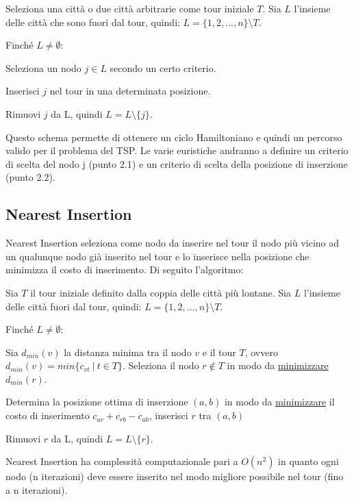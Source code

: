 \documentclass[a4paper,12pt]{report}
\begin{document}
\begin{tcolorbox}[colframe=black,colback=white,boxrule=0.5pt, sharp corners, breakable]
\begin{legal}
  \item Seleziona una città o due città arbitrarie come tour iniziale $T$. Sia $L$ l'insieme delle città che sono fuori dal tour, quindi: $L = \{1, 2, ..., n\} \setminus T$.
  \item Finché $L \neq \emptyset$:
  \begin{legal}
    \item Seleziona un nodo $j \in L$ secondo un certo criterio.
    \item Inserisci $j$ nel tour in una determinata posizione.
    \item Rimuovi $j$ da L, quindi $L = L \setminus \{j\}$.
  \end{legal}
\end{legal}
\end{tcolorbox}
\hfill \break
Questo schema permette di ottenere un ciclo Hamiltoniano e quindi un percorso valido per il problema del TSP. Le varie euristiche andranno a definire un criterio di scelta del nodo j (punto 2.1) e un criterio di scelta della posizione di inserzione (punto 2.2).

\subsection{Nearest Insertion} \label{ssec:NI}
Nearest Insertion seleziona come nodo da inserire nel tour il nodo più vicino ad un qualunque nodo già inserito nel tour e lo inserisce nella posizione che minimizza il costo di inserimento. Di seguito l'algoritmo:

\begin{tcolorbox}[colframe=black,colback=white,boxrule=0.5pt, sharp corners, breakable]
  \begin{legal}
    \item Sia $T$ il tour iniziale definito dalla coppia delle città più lontane. Sia $L$ l'insieme delle città fuori dal tour, quindi: $L = \{1, 2, ..., n\} \setminus T$.
    \item Finché $L \neq \emptyset$:
    \begin{legal}
      \item Sia $d_{min}(v)$ la distanza minima tra il nodo $v$ e il tour $T$, ovvero $d_{min}(v) = min\{c_{vt} \  | \ t \in T \}$. Seleziona il nodo $r \not \in T$ in modo da \underline{minimizzare} $d_{min}(r)$.
      \item Determina la posizione ottima di inserzione $(a, b)$ in modo da \underline{minimizzare} il costo di inserimento $c_{ar} + c_{rb} - c_{ab}$, inserisci $r$ tra $(a, b)$
      \item Rimuovi $r$ da L, quindi $L = L \setminus \{r\}$.
    \end{legal}
  \end{legal}
  \end{tcolorbox}
\hfill \break Nearest Insertion ha complessità computazionale pari a $O(n^2)$ in quanto ogni nodo (n iterazioni) deve essere inserito nel modo migliore possibile nel tour (fino a n iterazioni).
\end{document}
